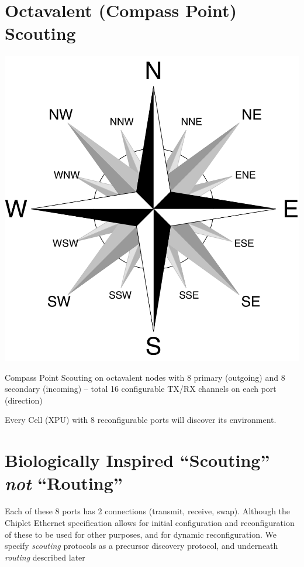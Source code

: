 \documentclass[../HFT-main.tex]{subfiles} %
\begin{document}
\section{Octavalent (Compass Point) Scouting} %
\begin{marginfigure}
  \includegraphics[width=\linewidth]{../Figures/Compass-Rose.pdf}
  \caption{Compass Point Scouting on octavalent nodes with 8 primary (outgoing) and 8 secondary (incoming) --  total 16 configurable TX/RX channels on each port (direction)}
\end{marginfigure}

Every Cell (XPU) with 8 reconfigurable ports will discover its environment.


\section{Biologically Inspired “Scouting” \emph{not}  “Routing”}

Each of these 8 ports has 2 connections (transmit, receive, swap). Although the Chiplet Ethernet specification allows for initial configuration and reconfiguration of these to be used for other purposes, and for dynamic reconfiguration. We specify \emph{scouting} protocols as a precursor discovery protocol, and underneath \emph{routing} described later  
\end{document}
